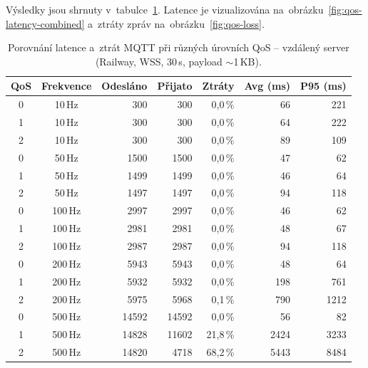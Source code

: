 Výsledky jsou shrnuty v~tabulce~\ref{tab:qos-remote}. Latence je vizualizována na~obrázku~\ref{fig:qos-latency-combined} a~ztráty zpráv na~obrázku~\ref{fig:qos-loss}.

\begin{table}[ht]
\centering
\small
\begin{tabular}{ccrrrrr}
\hline
\textbf{QoS} & \textbf{Frekvence} & \textbf{Odesláno} & \textbf{Přijato} & \textbf{Ztráty} & \textbf{Avg (ms)} & \textbf{P95 (ms)} \\
\hline
0 & 10\,Hz  & 300   & 300   & 0,0\,\%  & 66    & 221 \\
1 & 10\,Hz  & 300   & 300   & 0,0\,\%  & 64    & 222 \\
2 & 10\,Hz  & 300   & 300   & 0,0\,\%  & 89    & 109 \\
\hline
0 & 50\,Hz  & 1500  & 1500  & 0,0\,\%  & 47    & 62 \\
1 & 50\,Hz  & 1499  & 1499  & 0,0\,\%  & 46    & 64 \\
2 & 50\,Hz  & 1497  & 1497  & 0,0\,\%  & 94    & 118 \\
\hline
0 & 100\,Hz & 2997  & 2997  & 0,0\,\%  & 46    & 62 \\
1 & 100\,Hz & 2981  & 2981  & 0,0\,\%  & 48    & 67 \\
2 & 100\,Hz & 2987  & 2987  & 0,0\,\%  & 94    & 118 \\
\hline
0 & 200\,Hz & 5943  & 5943  & 0,0\,\%  & 48    & 64 \\
1 & 200\,Hz & 5932  & 5932  & 0,0\,\%  & 198   & 761 \\
2 & 200\,Hz & 5975  & 5968  & 0,1\,\%  & 790   & 1212 \\
\hline
0 & 500\,Hz & 14592 & 14592 & 0,0\,\%  & 56    & 82 \\
1 & 500\,Hz & 14828 & 11602 & 21,8\,\% & 2424  & 3233 \\
2 & 500\,Hz & 14820 & 4718  & 68,2\,\% & 5443  & 8484 \\
\hline
\end{tabular}
\caption{Porovnání latence a~ztrát MQTT při různých úrovních QoS -- vzdálený server (Railway, WSS, 30\,s, payload $\sim$1\,KB).}
\label{tab:qos-remote}
\end{table}

